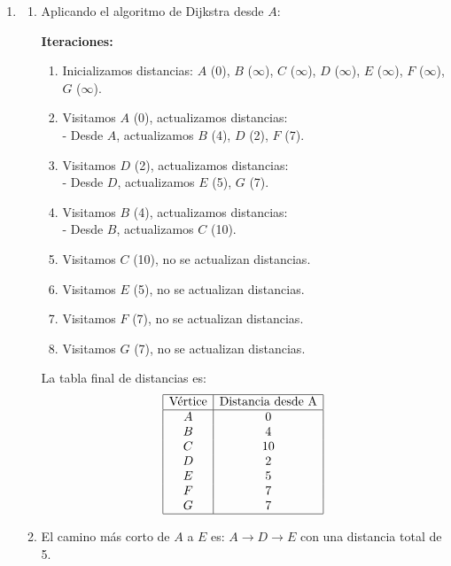 \documentclass[12pt]{article}
\begin{document}
\begin{enumerate}
        \item 
          \begin{enumerate}[label=\alph*)]
            \item Aplicando el algoritmo de Dijkstra desde \(A\):

            \vspace{0.5em}
            \textbf{Iteraciones:}
            \begin{enumerate}
              \item Inicializamos distancias: \(A\) (0), \(B\) (\(\infty\)), \(C\) (\(\infty\)), \(D\) (\(\infty\)), \(E\) (\(\infty\)), \(F\) (\(\infty\)), \(G\) (\(\infty\)).
              \item Visitamos \(A\) (0), actualizamos distancias: \\
                - Desde \(A\), actualizamos \(B\) (4), \(D\) (2), \(F\) (7).
              \item Visitamos \(D\) (2), actualizamos distancias: \\
                - Desde \(D\), actualizamos \(E\) (5), \(G\) (7).
              \item Visitamos \(B\) (4), actualizamos distancias: \\
                - Desde \(B\), actualizamos \(C\) (10).
              \item Visitamos \(C\) (10), no se actualizan distancias.
              \item Visitamos \(E\) (5), no se actualizan distancias.
              \item Visitamos \(F\) (7), no se actualizan distancias.
              \item Visitamos \(G\) (7), no se actualizan distancias.
            \end{enumerate}
            La tabla final de distancias es:
            \[
              \begin{array}{|c|c|}
                \hline
                \text{Vértice} & \text{Distancia desde A}\\
                \hline
                A & 0 \\
                B & 4 \\
                C & 10 \\
                D & 2 \\
                E & 5 \\
                F & 7 \\
                G & 7 \\
                \hline
              \end{array}
            \]
            \item El camino más corto de \(A\) a \(E\) es: \(A \to D \to E\) con una distancia total de 5.
          \end{enumerate}
      \end{enumerate}
\end{document}
